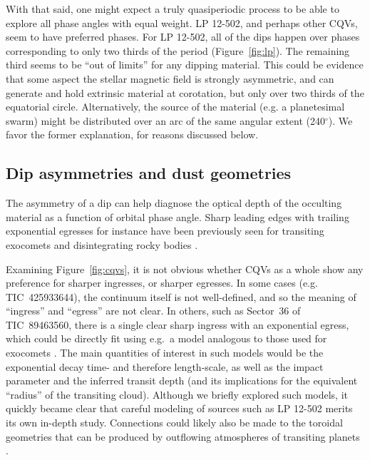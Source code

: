 \documentclass[11pt,twocolumn,tighten]{aastex63}
\begin{document}
With that said, one might expect a truly quasiperiodic process to be
able to explore all phase angles with equal weight.  LP 12-502, and
perhaps other CQVs, seem to have preferred phases.  For LP 12-502,
all of the dips happen over phases corresponding to only two thirds of
the period (Figure~\ref{fig:lp}).  The remaining third seems to be
``out of limits'' for any dipping material.  This could be evidence
that some aspect the stellar magnetic field is strongly asymmetric,
and can generate and hold extrinsic material at corotation, but only
over two thirds of the equatorial circle.  Alternatively, the source
of the material (e.g. a planetesimal swarm) might be distributed over
an arc of the same angular extent (240$^\circ$).  We favor the former
explanation, for reasons discussed below.

\subsection{Dip asymmetries and dust geometries}
The asymmetry of a dip can help diagnose the optical depth of the
occulting material as a function of orbital phase angle.  Sharp
leading edges with trailing exponential egresses for instance have
been previously seen for transiting exocomets and disintegrating rocky
bodies
\citep[e.g.][]{2012ApJ...752....1R,2012A&A...545L...5B,2015Natur.526..546V,2019A&A...625L..13Z}.

Examining Figure~\ref{fig:cqvs}, it is not obvious whether CQVs as
a whole show any preference for sharper ingresses, or sharper
egresses.  In some cases (e.g. TIC~425933644), the continuum itself is
not well-defined, and so the meaning of ``ingress'' and
``egress'' are not clear.  In others, such as Sector~36
of TIC~89463560, there is a single clear sharp ingress with an
exponential egress, which could be directly fit using e.g.~a model
analogous to those used for exocomets
\citep[e.g.][]{2019A&A...625L..13Z}.  The main quantities of interest
in such models would be the exponential decay time- and therefore
length-scale, as well as the impact parameter and the inferred transit
depth (and its implications for the equivalent ``radius'' of the
transiting cloud).  Although we briefly explored such models, it
quickly became clear that careful modeling of sources such as LP
12-502 merits its own in-depth study.  Connections could likely also
be made to the toroidal geometries that can be produced by outflowing
atmospheres of transiting planets
\citep[e.g.][]{2019ApJ...873...89M,2022ApJ...926..226M}.
\end{document}
